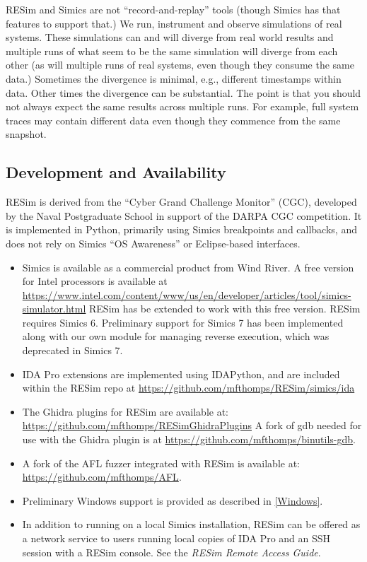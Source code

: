 \documentclass[titlepage]{article}
\begin{document}
RESim and Simics are not ``record-and-replay'' tools (though Simics has that features to support that.)  We run, instrument and observe simulations of real systems.
These simulations can and will diverge from real world results and multiple runs of what seem to be the same simulation will diverge from each other (as will
multiple runs of real systems, even though they consume the same data.)  Sometimes the divergence is minimal, e.g., different timestamps within data.  Other times
the divergence can be substantial.  The point is that you should not always expect the same results across multiple runs.  For example, full system traces
may contain different data even though they commence from the same snapshot.  

\subsection{Development and Availability}
RESim is derived from the “Cyber Grand Challenge Monitor” (CGC), developed by the Naval Postgraduate School in support of the DARPA CGC competition.  
It is implemented in Python, primarily using Simics breakpoints and callbacks, and does not rely on 
Simics “OS Awareness” or Eclipse-based interfaces.   
\begin{itemize}
\item Simics is available as a commercial product from Wind River.  A free version for Intel processors is available at
\url{https://www.intel.com/content/www/us/en/developer/articles/tool/simics-simulator.html}  RESim has be extended to work with this
free version.  RESim requires Simics 6.  Preliminary support for Simics 7 has been implemented along with our own module for managing
reverse execution, which was deprecated in Simics 7.

\item IDA Pro extensions are implemented using IDAPython, and are included within the RESim repo at
\url{https://github.com/mfthomps/RESim/simics/ida}  

\item The Ghidra plugins for RESim are available at: \url{https://github.com/mfthomps/RESimGhidraPlugins}  A fork 
of gdb needed for use with the Ghidra plugin is at \url{https://github.com/mfthomps/binutils-gdb}.

\item A fork of the AFL fuzzer integrated with 
RESim is available at: \url{https://github.com/mfthomps/AFL}.

\item Preliminary Windows support is provided as described in \ref{Windows}.

\item In addition to running on a local Simics installation, RESim can be offered as a network service to users running local copies of IDA Pro and an SSH session with a RESim console.  See the \textit{RESim Remote Access Guide}.  
\end{itemize}
\end{document}
